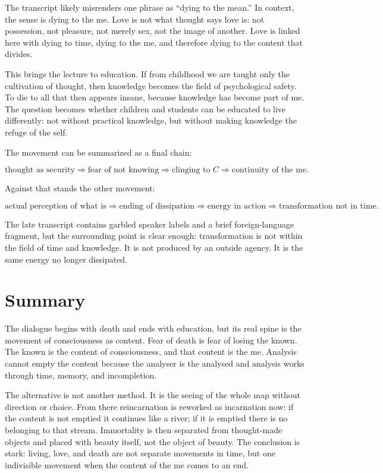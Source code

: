 The transcript likely misrenders one phrase as ``dying to the mean.'' In context, the sense is dying to the me. Love is not what thought says love is: not possession, not pleasure, not merely sex, not the image of another. Love is linked here with dying to time, dying to the me, and therefore dying to the content that divides.

This brings the lecture to education. If from childhood we are taught only the cultivation of thought, then knowledge becomes the field of psychological safety. To die to all that then appears insane, because knowledge has become part of me. The question becomes whether children and students can be educated to live differently: not without practical knowledge, but without making knowledge the refuge of the self.

The movement can be summarized as a final chain:

\begin{equation}
\text{thought as security}
\Rightarrow
\text{fear of not knowing}
\Rightarrow
\text{clinging to } C
\Rightarrow
\text{continuity of the me}.
\end{equation}

Against that stands the other movement:

\begin{equation}
\text{actual perception of what is}
\Rightarrow
\text{ending of dissipation}
\Rightarrow
\text{energy in action}
\Rightarrow
\text{transformation not in time}.
\end{equation}

The late transcript contains garbled speaker labels and a brief foreign-language fragment, but the surrounding point is clear enough: transformation is not within the field of time and knowledge. It is not produced by an outside agency. It is the same energy no longer dissipated.

\section{Summary}

The dialogue begins with death and ends with education, but its real spine is the movement of consciousness as content. Fear of death is fear of losing the known. The known is the content of consciousness, and that content is the me. Analysis cannot empty the content because the analyser is the analysed and analysis works through time, memory, and incompletion.

The alternative is not another method. It is the seeing of the whole map without direction or choice. From there reincarnation is reworked as incarnation now: if the content is not emptied it continues like a river; if it is emptied there is no belonging to that stream. Immortality is then separated from thought-made objects and placed with beauty itself, not the object of beauty. The conclusion is stark: living, love, and death are not separate movements in time, but one indivisible movement when the content of the me comes to an end.